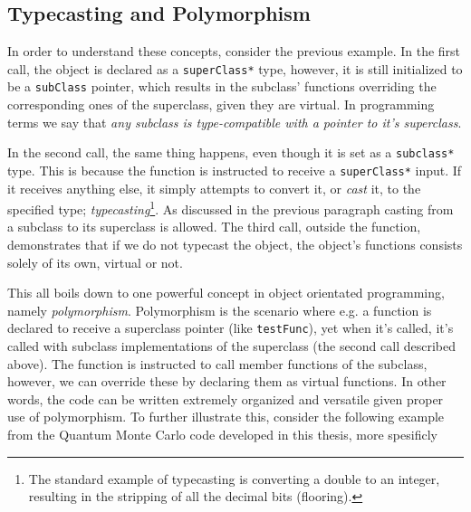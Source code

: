 \subsection*{Typecasting and Polymorphism}

In order to understand these concepts, consider the previous example. In the first call, the object is declared as a \verb+superClass*+ type, however, it is still initialized to be a \verb+subClass+ pointer, which results in the subclass' functions overriding the corresponding ones of the superclass, given they are virtual. In programming terms we say that \textit{any subclass is type-compatible with a pointer to it's superclass}.%

In the second call, the same thing happens, even though it is set as a \verb+subclass*+ type. This is because the function is instructed to receive a \verb+superClass*+ input. If it receives anything else, it simply attempts to convert it, or \textit{cast} it, to the specified type; \textit{typecasting}\footnote{The standard example of typecasting is converting a double to an integer, resulting in the stripping of all the decimal bits (flooring).}. As discussed in the previous paragraph casting from a subclass to its superclass is allowed. The third call, outside the function, demonstrates that if we do not typecast the object, the object's functions consists solely of its own, virtual or not.

This all boils down to one powerful concept in object orientated programming, namely \textit{polymorphism}. Polymorphism is the scenario where e.g. a function is declared to receive a superclass pointer (like \verb+testFunc+), yet when it's called, it's called with subclass implementations of the superclass (the second call described above). The function is instructed to call member functions of the subclass, however, we can override these by declaring them as virtual functions. In other words, the code can be written extremely organized and versatile given proper use of polymorphism. To further illustrate this, consider the following example from the Quantum Monte Carlo code developed in this thesis, more spesificly 

